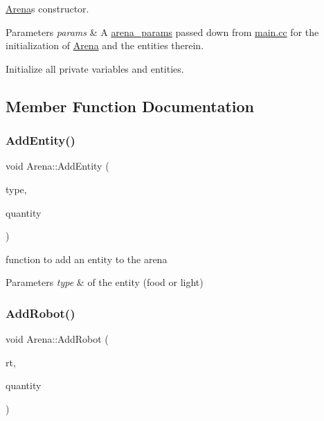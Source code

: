 \mbox{\hyperlink{class_arena}{Arena}}\textquotesingle{}s constructor. 


\begin{DoxyParams}{Parameters}
{\em params} & A \mbox{\hyperlink{structarena__params}{arena\+\_\+params}} passed down from \mbox{\hyperlink{main_8cc}{main.\+cc}} for the initialization of \mbox{\hyperlink{class_arena}{Arena}} and the entities therein.\\
\hline
\end{DoxyParams}
Initialize all private variables and entities. 

\subsection{Member Function Documentation}
\mbox{\label{class_arena_a9e00ef1a079d49d648359952fcfaa9f3}} 
\subsubsection{\texorpdfstring{Add\+Entity()}{AddEntity()}}
{\footnotesize\ttfamily void Arena\+::\+Add\+Entity (\begin{DoxyParamCaption}\item[{Entity\+Type}]{type,  }\item[{int}]{quantity }\end{DoxyParamCaption})}



function to add an entity to the arena 


\begin{DoxyParams}{Parameters}
{\em type} & of the entity (food or light) \\
\hline
\end{DoxyParams}
\mbox{\label{class_arena_a0012b0774ae6642a1a559b97ca335c4b}} 
\subsubsection{\texorpdfstring{Add\+Robot()}{AddRobot()}}
{\footnotesize\ttfamily void Arena\+::\+Add\+Robot (\begin{DoxyParamCaption}\item[{Robot\+Type}]{rt,  }\item[{int}]{quantity }\end{DoxyParamCaption})}



